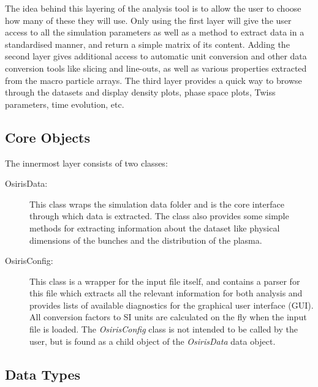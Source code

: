 The idea behind this layering of the analysis tool is to allow the user to choose how many of these they will use.
Only using the first layer will give the user access to all the simulation parameters as well as a method to extract data in a standardised manner, and return a simple matrix of its content.
Adding the second layer gives additional access to automatic unit conversion and other data conversion tools like slicing and line-outs, as well as various properties extracted from the macro particle arrays.
The third layer provides a quick way to browse through the datasets and display density plots, phase space plots, Twiss parameters, time evolution, etc.

\subsection{Core Objects}
\label{Tools:OALay1}

The innermost layer consists of two classes:

\begin{description}
    \item[OsirisData:] This class wraps the simulation data folder and is the core interface through which data is extracted.
    The class also provides some simple methods for extracting information about the dataset like physical dimensions of the bunches and the distribution of the plasma.
    
    \item[OsirisConfig:] This class is a wrapper for the input file itself, and contains a parser for this file which extracts all the relevant information for both analysis and provides lists of available diagnostics for the graphical user interface (GUI).
    All conversion factors to SI units are calculated on the fly when the input file is loaded.
    The \emph{OsirisConfig} class is not intended to be called by the user, but is found as a child object of the \emph{OsirisData} data object.
\end{description}

\subsection{Data Types}
\label{Tools:OALay2}

